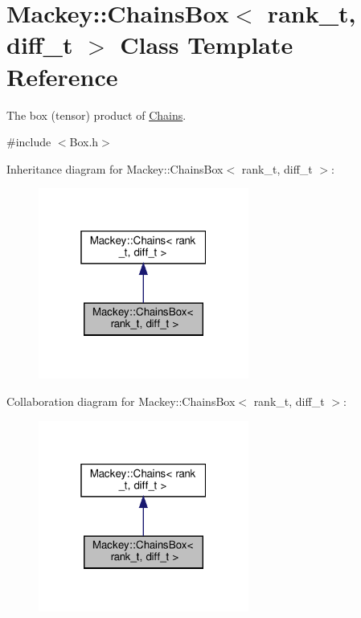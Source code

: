 \hypertarget{classMackey_1_1ChainsBox}{}\section{Mackey\+:\+:Chains\+Box$<$ rank\+\_\+t, diff\+\_\+t $>$ Class Template Reference}
\label{classMackey_1_1ChainsBox}


The box (tensor) product of \hyperlink{classMackey_1_1Chains}{Chains}.  




{\ttfamily \#include $<$Box.\+h$>$}



Inheritance diagram for Mackey\+:\+:Chains\+Box$<$ rank\+\_\+t, diff\+\_\+t $>$\+:\nopagebreak
\begin{figure}[H]
\begin{center}
\leavevmode
\includegraphics[width=196pt]{classMackey_1_1ChainsBox__inherit__graph}
\end{center}
\end{figure}


Collaboration diagram for Mackey\+:\+:Chains\+Box$<$ rank\+\_\+t, diff\+\_\+t $>$\+:\nopagebreak
\begin{figure}[H]
\begin{center}
\leavevmode
\includegraphics[width=196pt]{classMackey_1_1ChainsBox__coll__graph}
\end{center}
\end{figure}
